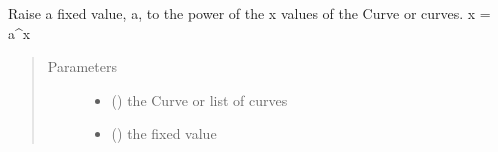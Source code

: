 \documentclass[letterpaper,10pt,english]{sphinxmanual}
\begin{document}

\begin{fulllineitems}
\label{\detokenize{pydv:pydvpy.powax}}
Raise a fixed value, a, to the power of the x values of the Curve or curves. x = a\textasciicircum{}x

\begin{sphinxVerbatim}[commandchars=\\\{\}]
  
\end{sphinxVerbatim}

\begin{sphinxVerbatim}[commandchars=\\\{\}]
  
\end{sphinxVerbatim}

\begin{sphinxVerbatim}[commandchars=\\\{\}]
\PYG{p}{[}\PYG{p}{]} 
\end{sphinxVerbatim}
\begin{quote}\begin{description}
\item[{Parameters}] \leavevmode\begin{itemize}
\item {} 
 ({\hyperref[\detokenize{pydv:curve.Curve}]{}}) \textendash{} the Curve or list of curves

\item {} 
 () \textendash{} the fixed value

\end{itemize}

\end{description}\end{quote}

\end{fulllineitems}
\end{document}
